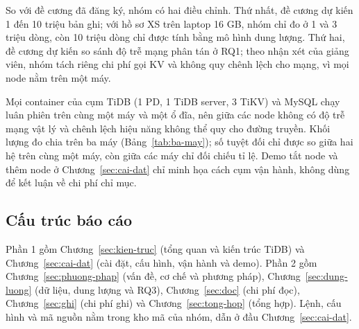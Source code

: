 So với đề cương đã đăng ký, nhóm có hai điều chỉnh. Thứ nhất, đề cương dự kiến 1 đến 10 triệu bản ghi; với hồ sơ XS trên laptop 16 GB, nhóm chỉ đo ở 1 và 3 triệu dòng, còn 10 triệu dòng chỉ được tính bằng mô hình dung lượng. Thứ hai, đề cương dự kiến so sánh độ trễ mạng phân tán ở RQ1; theo nhận xét của giảng viên, nhóm tách riêng chi phí gọi KV và không quy chênh lệch cho mạng, vì mọi node nằm trên một máy.

Mọi container của cụm TiDB (1 PD, 1 TiDB server, 3 TiKV) và MySQL chạy luân phiên trên cùng một máy và một ổ đĩa, nên giữa các node không có độ trễ mạng vật lý và chênh lệch hiệu năng không thể quy cho đường truyền. Khối lượng đo chia trên ba máy (Bảng~\ref{tab:ba-may}); số tuyệt đối chỉ được so giữa hai hệ trên cùng một máy, còn giữa các máy chỉ đối chiếu tỉ lệ. Demo tắt node và thêm node ở Chương~\ref{sec:cai-dat} chỉ minh họa cách cụm vận hành, không dùng để kết luận về chi phí chỉ mục.

\subsection{Cấu trúc báo cáo}
Phần 1 gồm Chương~\ref{sec:kien-truc} (tổng quan và kiến trúc TiDB) và Chương~\ref{sec:cai-dat} (cài đặt, cấu hình, vận hành và demo). Phần 2 gồm Chương~\ref{sec:phuong-phap} (vấn đề, cơ chế và phương pháp), Chương~\ref{sec:dung-luong} (dữ liệu, dung lượng và RQ3), Chương~\ref{sec:doc} (chi phí đọc), Chương~\ref{sec:ghi} (chi phí ghi) và Chương~\ref{sec:tong-hop} (tổng hợp). Lệnh, cấu hình và mã nguồn nằm trong kho mã của nhóm, dẫn ở đầu Chương~\ref{sec:cai-dat}.
